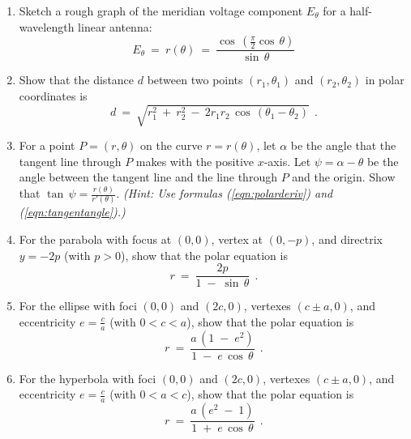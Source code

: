 {\begin{enumerate}[\bfseries 1.]
\newpage
{}
\par\noindent For Exercises 13-15, sketch the graph of the given curve and
indicate all local maxima and minima.
[{[\bfseries 1.]}]
[{[\bfseries 1.]}]
 \item Sketch a rough graph of the meridian voltage component $E_{\theta}$ for a
  half-wavelength linear antenna:
\[
E_{\theta} ~=~ r(\theta) ~=~ \frac{\cos\,(\frac{\pi}{2} \cos\,\theta)}{\sin\,\theta}
\]
 \item Show that the distance $d$ between two points $(r_1 , \theta_1)$ and
  $(r_2 , \theta_2)$ in polar coordinates is
\[
d ~=~ \sqrt{r_1^2 ~+~ r_2^2 ~-~ 2r_1r_2\,\cos\,(\theta_1 - \theta_2)} ~~.
\]
 \item For a point $P=(r,\theta)$ on the curve $r=r(\theta)$, let $\alpha$ be
  the angle that the tangent line through $P$ makes with the positive $x$-axis.
  Let $\psi=\alpha-\theta$ be the angle between the tangent line and the line
  through $P$ and the origin. Show that
  $\tan\,\psi = \frac{r(\theta)}{r'(\theta)}$. \emph{(Hint: Use formulas
  (\ref{eqn:polarderiv}) and (\ref{eqn:tangentangle}).)}
 \item For the parabola with focus at $(0,0)$, vertex at $(0,-p)$, and
  directrix $y=-2p$ (with $p > 0$), show that the polar equation is
\[
r ~=~ \frac{2p}{1 \;-\; \sin\,\theta} ~~.
\]
 \item For the ellipse with foci $(0,0)$ and $(2c,0)$, vertexes $(c \pm a,0)$,
  and eccentricity $e=\frac{c}{a}$ (with $0 < c < a$), show that the polar
  equation is
\[
r ~=~ \frac{a\,(1 \;-\; e^2)}{1 \;-\; e\,\cos\,\theta} ~~.
\]
 \item For the hyperbola with foci $(0,0)$ and $(2c,0)$, vertexes $(c \pm a,0)$,
  and eccentricity $e=\frac{c}{a}$ (with $0 < a < c$), show that the polar
  equation is
\[
r ~=~ \frac{a\,(e^2 \;-\; 1)}{1 \;+\; e\,\cos\,\theta} ~~.
\]
\end{enumerate}}
